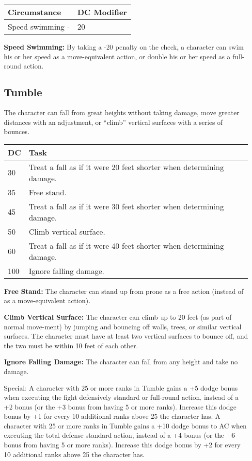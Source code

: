 \documentclass{article}
\begin{document}
\begin{tabular}{|>{\raggedright}p{68pt}|>{\raggedright}p{53pt}|}
\hline
C\textbf{ircumstance } & D\textbf{C Modifier }\tabularnewline
\hline
Speed swimming - & 20 \tabularnewline
\hline
\end{tabular}

\textbf{Speed Swimming: }By taking a -20 penalty on the check, a character can 
swim his or her speed as a move-equivalent action, or double his or her speed as 
a full-round action. 

\vspace{12pt}
\subsection*{Tumble }

The character can fall from great heights without taking damage, move greater distances 
with an adjustment, or ``climb'' vertical surfaces with a series of bounces. 

\begin{tabular}{|>{\raggedright}p{13pt}|>{\raggedright}p{263pt}|}
\hline
D\textbf{C } & T\textbf{ask }\tabularnewline
\hline
30  & Treat a fall as if it were 20 feet shorter when determining damage. \tabularnewline
\hline
35  & Free stand. \tabularnewline
\hline
45  & Treat a fall as if it were 30 feet shorter when determining damage. \tabularnewline
\hline
50  & Climb vertical surface. \tabularnewline
\hline
60  & Treat a fall as if it were 40 feet shorter when determining damage. \tabularnewline
\hline
100  & Ignore falling damage. \tabularnewline
\hline
\end{tabular}

\textbf{Free Stand: }The character can stand up from prone as a free action (instead 
of as a move-equivalent action). 

\textbf{Climb Vertical Surface: }The character can climb up to 20 feet (as part 
of normal move-ment) by jumping and bouncing off walls, trees, or similar vertical 
surfaces. The character must have at least two vertical surfaces to bounce off, 
and the two must be within 10 feet of each other. 

\textbf{Ignore Falling Damage: }The character can fall from any height and take 
no damage. 

Special: A character with 25 or more ranks in Tumble gains a +5 dodge bonus when 
executing the fight defensively standard or full-round action, instead of a +2 
bonus (or the +3 bonus from having 5 or more ranks). Increase this dodge bonus 
by +1 for every 10 additional ranks above 25 the character has. A character with 
25 or more ranks in Tumble gains a +10 dodge bonus to AC when executing the total 
defense standard action, instead of a +4 bonus (or the +6 bonus from having 5 or 
more ranks). Increase this dodge bonus by +2 for every 10 additional ranks above 
25 the character has. 
\end{document}
